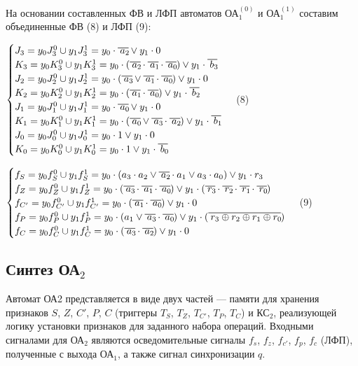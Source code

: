 На основании составленных ФВ и ЛФП автоматов ОА$^{(0)}_{1}$ и ОА$^{(1)}_{1}$ составим объединенные ФВ (8) и ЛФП (9):

$
\begin{cases}
J_3 = y_0 J^0_3 \cup y_1 J^1_3 = y_0 \cdot \oline{a_2} \vee y_1 \cdot 0
\\
K_3 = y_0 K^0_3 \cup y_1 K^1_3 = y_0 \cdot (\oline{a_2} \cdot \oline{a_1} \cdot \oline{a_0}) \vee y_1 \cdot \oline{b_3}
\\
J_2 = y_0 J^0_2 \cup y_1 J^1_2 = y_0 \cdot (\oline{a_3} \vee \oline{a_1} \cdot \oline{a_0}) \vee y_1 \cdot 0
\\
K_2 = y_0 K^0_2 \cup y_1 K^1_2 = y_0 \cdot (\oline{a_1} \cdot \oline{a_0}) \vee y_1 \cdot \oline{b_2}
\\
J_1 = y_0 J^0_1 \cup y_1 J^1_1 = y_0 \cdot \oline{a_0} \vee y_1 \cdot 0
\\
K_1 = y_0 K^0_1 \cup y_1 K^1_1 = y_0 \cdot (\oline{a_0} \vee \oline{a_3} \cdot \oline{a_2}) \vee y_1 \cdot \oline{b_1}
\\
J_0 = y_0 J^0_0 \cup y_1 J^1_0 = y_0 \cdot 1 \vee y_1 \cdot 0
\\
K_0 = y_0 K^0_0 \cup y_1 K^1_0 = y_0 \cdot 1 \vee y_1 \cdot \oline{b_0}
\end{cases}
$ (8)

$
\begin{cases}
f_S = y_0 f^0_S \cup y_1 f^1_S = y_0 \cdot (a_3 \cdot a_2 \vee \oline{a_2} \cdot a_1 \vee a_3 \cdot a_0) \vee y_1 \cdot r_3
\\
f_Z = y_0 f^0_Z \cup y_1 f^1_Z = y_0 \cdot (\oline{a_3} \cdot \oline{a_1} \cdot \oline{a_0}) \vee y_1 \cdot (\oline{r_3} \cdot \oline{r_2} \cdot \oline{r_1} \cdot \oline{r_0})
\\
f_{C'} = y_0 f^0_{C'} \cup y_1 f^1_{C'} = y_0 \cdot (\oline{a_1} \cdot \oline{a_0}) \vee y_1 \cdot 0
\\
f_P = y_0 f^0_P \cup y_1 f^1_P = y_0 \cdot (a_1 \vee \oline{a_3} \cdot \oline{a_0}) \vee y_1 \cdot (\oline{r_3 \oplus r_2 \oplus r_1 \oplus r_0})
\\
f_C = y_0 f^0_C \cup y_1 f^1_C = y_0 \cdot (\oline{a_3} \cdot \oline{a_2}) \vee y_1 \cdot 0
\end{cases}
$ (9)



\clearpage
\subsection{Синтез ОА${}_2$}

 Автомат ОА2 представляется в виде двух частей --- памяти для хранения признаков $S$, $Z$, $C'$, $P$, $C$ (триггеры $T_S$, $T_Z$, $T_{C'}$, $T_P$, $T_C$) и КС$_2$, реализующей логику установки признаков для заданного набора операций. Входными сигналами для ОА$_2$ являются осведомительные сигналы $f_s$, $f_z$, $f_{c'}$, $f_p$, $f_c$ (ЛФП), полученные с выхода ОА$_{1}$, а также сигнал синхронизации $q$.


